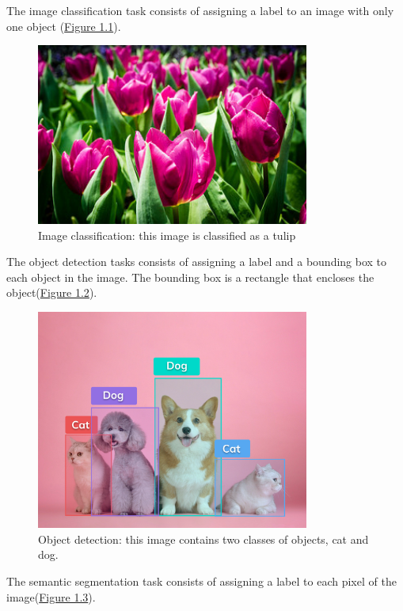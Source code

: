 The image classification task consists of assigning a label to an image with only one object (\hyperref[fig:figure-tulips]{Figure 1.1}).
\begin{figure}[H]
    \centering
    \includegraphics[width=0.8\textwidth]{images/1_1_tulips}
    \caption{Image classification: this image is classified as a tulip}
    \label{fig:figure-tulips}
\end{figure}
The object detection tasks consists of assigning a label and a bounding box to each object in the image.
The bounding box is a rectangle that encloses the object(\hyperref[fig:figure-object-detection]{Figure 1.2}).
\begin{figure}[H]
    \centering
    \includegraphics[width=0.8\textwidth]{images/1_1_object_detection}
    \caption{Object detection: this image contains two classes of objects, cat and dog.}
    \label{fig:figure-object-detection}
\end{figure}
The semantic segmentation task consists of assigning a label to each pixel of the image(\hyperref[fig:figure-semantic-segmentation]{Figure 1.3}).

